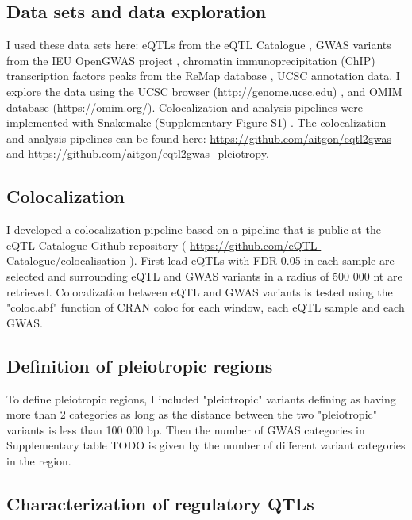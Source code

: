 \subsection*{Data sets and data exploration}

I used these data sets here: eQTLs from the eQTL Catalogue \citep{2021.Alasoo.Kerimov}, GWAS variants from the IEU OpenGWAS project \citep{2021.Marcora.Lyon}, chromatin immunoprecipitation (ChIP)	transcription factors peaks from the ReMap database \citep{2021.Ballester.Hammal}, UCSC annotation data.
%
I explore the data using the UCSC browser (\url{http://genome.ucsc.edu}) \citep{2021.Kent.Lee}, and OMIM database (\url{https://omim.org/}).
%
Colocalization and analysis pipelines were implemented with Snakemake (Supplementary Figure S1) .
%
The colocalization and analysis pipelines can be found here: \url{https://github.com/aitgon/eqtl2gwas} and \url{https://github.com/aitgon/eqtl2gwas_pleiotropy}.

\subsection*{Colocalization}

I developed a colocalization pipeline based on a pipeline that is public at the eQTL Catalogue Github repository ( \url{https://github.com/eQTL-Catalogue/colocalisation} ).
%
First lead eQTLs with FDR 0.05 in each sample are selected and surrounding eQTL and GWAS variants in a radius of 500 000 nt are retrieved.
%
Colocalization between eQTL and GWAS variants is tested using the "coloc.abf" function of CRAN coloc for each window, each eQTL sample and each GWAS.

\subsection*{Definition of pleiotropic regions}

To define pleiotropic regions, I included "pleiotropic" variants defining as having more than 2 categories as long as the distance between the two "pleiotropic" variants is less than 100 000 bp.
%
Then the number of GWAS categories in Supplementary table TODO is given by the number of different variant categories in the region.

\subsection*{Characterization of regulatory QTLs}


